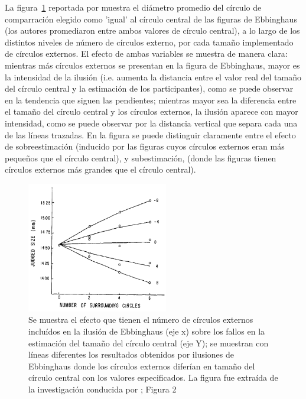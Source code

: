 La figura~\ref{fig:Ebb_Var} reportada por \parencite{Massaro1971} muestra el diámetro promedio del círculo de comparración elegido como 'igual' al círculo central de las figuras de Ebbinghaus (los autores promediaron entre ambos valores de círculo central), a lo largo de los distintos niveles de número de círculos externo, por cada tamaño implementado de círculos externos. El efecto de ambas variables se muestra de manera clara: mientras más círculos externos se presentan en la figura de Ebbinghaus, mayor es la intensidad de la ilusión (i.e. aumenta la distancia entre el valor real del tamaño del círculo central y la estimación de los participantes), como se puede observar en la tendencia que siguen las pendientes; mientras mayor sea la diferencia entre el tamaño del círculo central y los círculos externos, la ilusión aparece con mayor intensidad, como se puede observar por la distancia vertical que separa cada una de las líneas trazadas. En la figura se puede distinguir claramente entre el efecto de sobreestimación (inducido por las figuras cuyos círculos externos eran más pequeños que el círculo central), y subestimación, (donde las figuras tienen círculos externos más grandes que el círculo central). \\

\begin{figure}[th]
\centering
\includegraphics[width=0.55\textwidth]{Figures/Ebb_Variables} 
\decoRule
\caption[Efecto del Numero y Tamaño de los círculos externos en la Ilusión de Ebbinghaus]{Se muestra el efecto que tienen el número de círculos externos incluídos en la ilusión de Ebbinghaus (eje x) sobre los fallos en la estimación del tamaño del círculo central (eje Y); se muestran con líneas diferentes los resultados obtenidos por ilusiones de Ebbinghaus donde los círculos externos diferían en tamaño del círculo central con los valores especificados. La figura fue extraída de la investigación conducida por \parencite{Massaro1971}; Figura 2}
\label{fig:Ebb_Var}
\end{figure}


